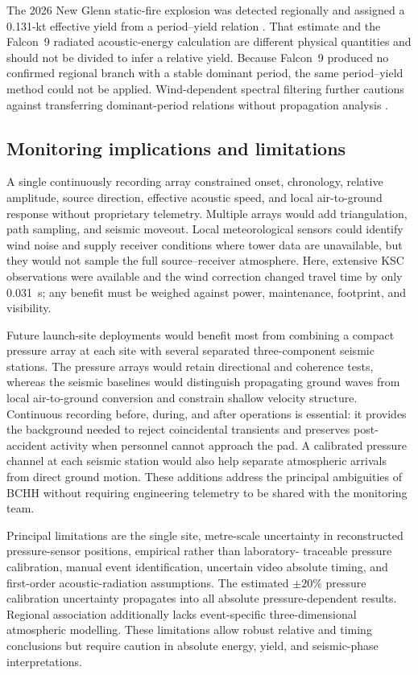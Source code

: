 \documentclass[]{seismica}
\begin{document}
The 2026 New Glenn static-fire explosion was detected regionally and assigned
a 0.131-kt effective yield from a period--yield relation
\citep{silber_scamfer_newglenn_2026}. That estimate and the Falcon~9 radiated
acoustic-energy calculation are different physical quantities and should not
be divided to infer a relative yield. Because Falcon~9 produced no confirmed
regional branch with a stable dominant period, the same period--yield method
could not be applied. Wind-dependent spectral filtering further cautions
against transferring dominant-period relations without propagation analysis
\citep{silber_wind_filtering_2026}.

\subsection{Monitoring implications and limitations}

A single continuously recording array constrained onset, chronology, relative
amplitude, source direction, effective acoustic speed, and local air-to-ground
response without proprietary telemetry. Multiple arrays would add
triangulation, path sampling, and seismic moveout. Local meteorological sensors
could identify wind noise and supply receiver conditions where tower data are
unavailable, but they would not sample the full source--receiver atmosphere.
Here, extensive KSC observations were available and the wind correction changed
travel time by only 0.031~s; any benefit must be weighed against power,
maintenance, footprint, and visibility.

Future launch-site deployments would benefit most from combining a compact
pressure array at each site with several separated three-component seismic
stations. The pressure arrays would retain directional and coherence tests,
whereas the seismic baselines would distinguish propagating ground waves from
local air-to-ground conversion and constrain shallow velocity structure.
Continuous recording before, during, and after operations is essential: it
provides the background needed to reject coincidental transients and preserves
post-accident activity when personnel cannot approach the pad. A calibrated
pressure channel at each seismic station would also help separate atmospheric
arrivals from direct ground motion. These additions address the principal
ambiguities of BCHH without requiring engineering telemetry to be shared with
the monitoring team.

Principal limitations are the single site, metre-scale uncertainty in
reconstructed pressure-sensor positions, empirical rather than laboratory-
traceable pressure calibration, manual event identification, uncertain video
absolute timing, and first-order acoustic-radiation assumptions. The estimated
$\pm20\%$ pressure calibration uncertainty propagates into all absolute
pressure-dependent results. Regional association additionally lacks
event-specific three-dimensional atmospheric modelling. These limitations
allow robust relative and timing conclusions but require caution in absolute
energy, yield, and seismic-phase interpretations.
\end{document}
